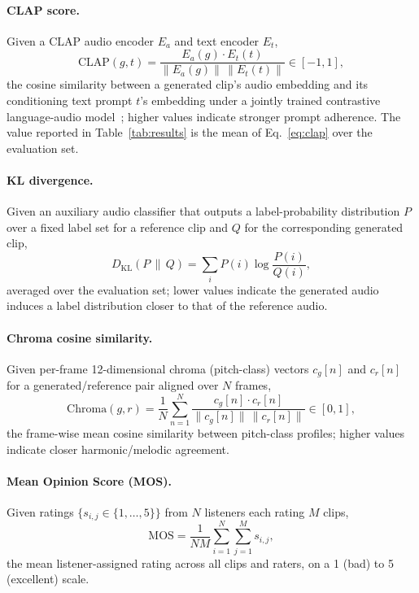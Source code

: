 \documentclass[11pt]{article}
\begin{document}
\paragraph{CLAP score.} Given a CLAP audio encoder $E_a$ and text encoder $E_t$,
\begin{equation}
\mathrm{CLAP}(g, t) = \frac{E_a(g) \cdot E_t(t)}{\lVert E_a(g) \rVert \, \lVert E_t(t) \rVert} \in [-1, 1],
\label{eq:clap}
\end{equation}
the cosine similarity between a generated clip's audio embedding and its conditioning text prompt $t$'s embedding under a jointly trained contrastive language-audio model~\cite{wu2023clap}; higher values indicate stronger prompt adherence. The value reported in Table~\ref{tab:results} is the mean of Eq.~\ref{eq:clap} over the evaluation set.

\paragraph{KL divergence.} Given an auxiliary audio classifier that outputs a label-probability distribution $P$ over a fixed label set for a reference clip and $Q$ for the corresponding generated clip,
\begin{equation}
D_{\mathrm{KL}}(P \,\|\, Q) = \sum_{i} P(i) \log \frac{P(i)}{Q(i)},
\label{eq:kl}
\end{equation}
averaged over the evaluation set; lower values indicate the generated audio induces a label distribution closer to that of the reference audio.

\paragraph{Chroma cosine similarity.} Given per-frame 12-dimensional chroma (pitch-class) vectors $c_g[n]$ and $c_r[n]$ for a generated/reference pair aligned over $N$ frames,
\begin{equation}
\mathrm{Chroma}(g, r) = \frac{1}{N} \sum_{n=1}^{N} \frac{c_g[n] \cdot c_r[n]}{\lVert c_g[n] \rVert \, \lVert c_r[n] \rVert} \in [0, 1],
\label{eq:chroma}
\end{equation}
the frame-wise mean cosine similarity between pitch-class profiles; higher values indicate closer harmonic/melodic agreement.

\paragraph{Mean Opinion Score (MOS).} Given ratings $\{ s_{i,j} \in \{1,\dots,5\} \}$ from $N$ listeners each rating $M$ clips,
\begin{equation}
\mathrm{MOS} = \frac{1}{NM} \sum_{i=1}^{N} \sum_{j=1}^{M} s_{i,j},
\label{eq:mos}
\end{equation}
the mean listener-assigned rating across all clips and raters, on a 1 (bad) to 5 (excellent) scale.
\end{document}
